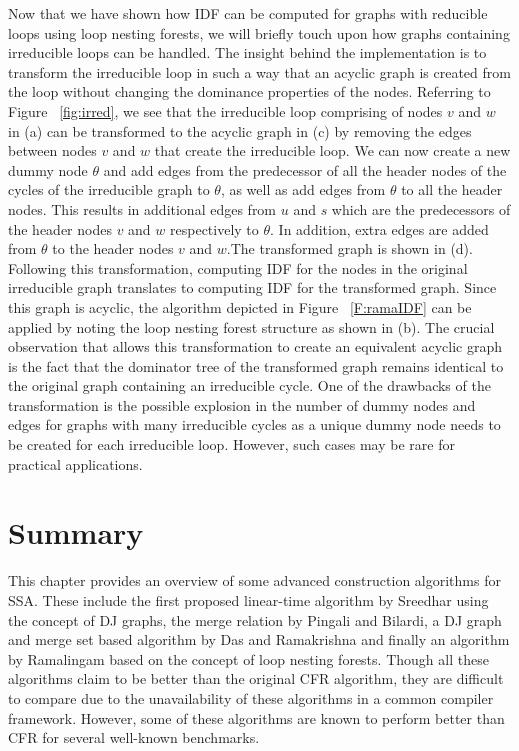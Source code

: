     Now that we have shown how IDF can be computed for graphs with reducible loops using 
    loop nesting forests, we will briefly touch
    upon how graphs containing irreducible loops can be handled. The insight behind the implementation
    is to transform the irreducible loop in such a way that an acyclic graph is created from the loop
    without changing the dominance properties of the nodes. Referring to Figure ~\ref{fig:irred}, we see 
    that the irreducible loop comprising of nodes $v$ and $w$ in (a) can be transformed to the acyclic
    graph in (c) by removing the edges between nodes $v$ and $w$ that create the irreducible loop. 
    We can now create a new dummy node $\theta$ and add edges from the predecessor of all
    the header nodes of the cycles of the irreducible graph to $\theta$, 
    as well as add edges from $\theta$ to all the 
    header nodes. This results in additional edges from $u$ and $s$ which are the predecessors of the
    header nodes $v$ and $w$ respectively to $\theta$. In addition, extra edges are added from $\theta$
    to the header nodes $v$ and $w$.The transformed graph is shown in (d). Following this transformation, 
    computing IDF for the nodes 
    in the original irreducible graph translates to computing IDF for the transformed graph. Since this
    graph is acyclic, the algorithm depicted in Figure ~\ref{F:ramaIDF} can be applied by noting the
    loop nesting forest structure as shown in (b). The crucial observation that allows this transformation 
    to create an equivalent acyclic
    graph is the fact that the dominator tree of the transformed graph remains identical to the
    original graph containing an irreducible cycle. One of the drawbacks of the transformation is the
    possible explosion in the number of dummy nodes and edges for graphs with many irreducible cycles as
    a unique dummy node needs to be created for each irreducible loop. However, such cases may be rare
    for practical applications.

    \section{Summary}
    This chapter provides an overview of some advanced construction algorithms
    for SSA. These include the first proposed linear-time algorithm by Sreedhar using the concept of
    DJ graphs, the merge relation by Pingali and Bilardi, a DJ graph and merge
    set based algorithm by Das and Ramakrishna and finally an algorithm by Ramalingam based on the concept
    of loop nesting forests. Though all these algorithms claim to be better than the original CFR algorithm, 
    they are difficult to compare due to the unavailability of these algorithms in a common compiler framework.
    However, some of these algorithms are known to perform better than CFR for several well-known benchmarks.


